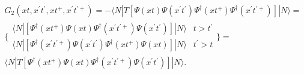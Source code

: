 \documentclass[11pt]{article}
\begin{document}
\begin{multline}
\nonumber
G_{2}(x t,x^{\prime}t^{\prime},x t^{+},x^{\prime} t^{\prime +}) = -
\langle N | T \left[
\Psi(x t)
\Psi(x^{\prime}t^{\prime})
\Psi^\dagger(x t^{+})
\Psi^\dagger(x^{\prime} t^{\prime +})
\right] | N \rangle  \nonumber
 = \\
\{\begin{array}{ll}
\langle N |  \left[
\Psi^\dagger(x t^{+})
\Psi(x t)
\Psi^\dagger(x^{\prime} t^{\prime +})
\Psi(x^{\prime} t^{\prime})
\right] | N\rangle  & t  > t^{\prime} \nonumber
\\
\langle N |  \left[
\Psi^\dagger(x^{\prime} t^{\prime +})
\Psi(x^{\prime} t^{\prime})
\Psi^\dagger(x t^{+})
\Psi(x t)
\right] | N\rangle  & t^{\prime} > t 
\end{array}\}
= \\
\langle N| T \left[
\Psi^\dagger(x t^{+})
\Psi(x t)
\Psi^\dagger(x^{\prime} t^{\prime +})
\Psi(x^{\prime}t^{\prime})
\right] | N \rangle.  
\end{multline}
\end{document}
